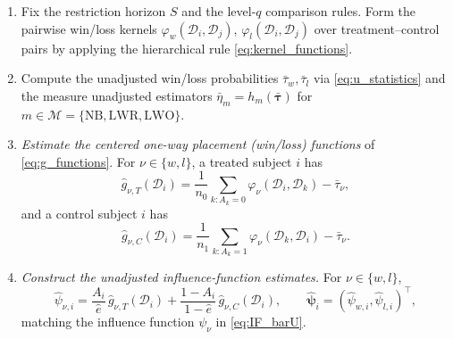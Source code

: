 \documentclass[11pt,a4paper]{article}
\begin{document}
\begin{enumerate}[label=Step \arabic*.]
\item Fix the restriction horizon $S$ and the level-$q$ comparison rules. Form the
pairwise win/loss kernels $\varphi_w(\mathcal D_i,\mathcal D_j)$,
$\varphi_l(\mathcal D_i,\mathcal D_j)$ over treatment--control pairs by applying the
hierarchical rule \eqref{eq:kernel_functions}.

\item Compute the unadjusted win/loss probabilities $\bar\tau_w,\bar\tau_l$ via \eqref{eq:u_statistics} and the
measure unadjusted estimators $\bar\eta_m=h_m(\bar{\boldsymbol\tau})$ for
$m\in\mathcal{M}=\{\mathrm{NB},\mathrm{LWR},\mathrm{LWO}\}$.

\item \emph{Estimate the centered one-way placement (win/loss) functions} of
\eqref{eq:g_functions}. For $\nu\in\{w,l\}$, a treated subject $i$ has
\[
   \hat g_{\nu,T}(\mathcal D_i)
   =\frac1{n_0}\!\!\sum_{k:A_k=0}\!\!\varphi_\nu(\mathcal D_i,\mathcal D_k)-\bar\tau_\nu,
\]
and a control subject $i$ has
\[
   \hat g_{\nu,C}(\mathcal D_i)
   =\frac1{n_1}\!\!\sum_{k:A_k=1}\!\!\varphi_\nu(\mathcal D_k,\mathcal D_i)-\bar\tau_\nu.
\]


\item \emph{Construct the unadjusted influence-function estimates.} For
$\nu\in\{w,l\}$,
\[
   \hat\psi_{\nu,i}
   =\frac{A_i}{\hat e}\,\hat g_{\nu,T}(\mathcal D_i)
   +\frac{1-A_i}{1-\hat e}\,\hat g_{\nu,C}(\mathcal D_i),
   \qquad
   \hat{\boldsymbol\psi}_i=(\hat\psi_{w,i},\hat\psi_{l,i})^\top,
\]
matching the influence function $\psi_\nu$ in \eqref{eq:IF_barU}.


\end{enumerate}
\end{document}
